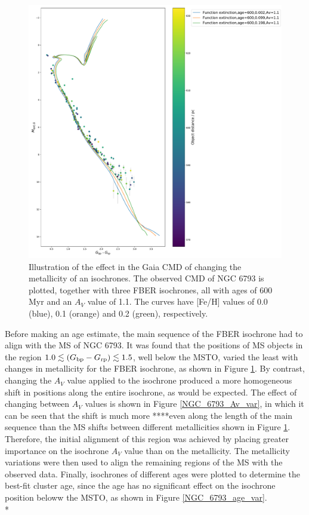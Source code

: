 \documentclass[12pt, a4paper]{report}
\begin{document}
\begin{figure}[h!]
\begin{center}
\includegraphics[width=1.0\textwidth]{../NGC_6793_CMD_FeH_0p002_0p099_0p198_Av_1p1_600Myr_isochrones_func_errorbars_T5k.pdf}
\caption{Illustration of the effect in the Gaia CMD of changing the metallicity of an isochrones. The observed CMD of NGC 6793 is plotted, together with three FBER isochrones, all with ages of 600 Myr and an $A_{V}$ value of 1.1. The curves have [Fe/H] values of 0.0 (blue), 0.1 (orange) and 0.2 (green), respectively.}
\label{NGC_6793_metal_var}
\end{center}
\end{figure}


Before making an age estimate, the main sequence of the FBER isochrone had to align with the MS of NGC 6793. It was found that the positions of MS objects in the region $1.0 \lesssim (G_{\textnormal{bp}}-G_{\textnormal{rp}}) \lesssim 1.5$, well below the MSTO, varied the least with changes in metallicity for the FBER isochrone, as shown in Figure \ref{NGC_6793_metal_var}. By contrast, changing the $A_{V}$ value applied to the isochrone produced a more homogeneous shift in positions along the entire isochrone, as would be expected. The effect of changing between $A_{V}$ values is shown in Figure \ref{NGC_6793_Av_var}, in which it can be seen that the shift is much more ****even along the length of the main sequence than the MS shifts between different metallicities shown in Figure \ref{NGC_6793_metal_var}. Therefore, the initial alignment of this region was achieved by placing greater importance on the isochrone $A_{V}$ value than on the metallicity. The metallicity variations were then used to align the remaining regions of the MS with the observed data. Finally, isochrones of different ages were plotted to determine the best-fit cluster age, since the age has no significant effect on the isochrone position beloww the MSTO, as shown in Figure \ref{NGC_6793_age_var}. \\*
\end{document}
